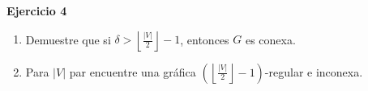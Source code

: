 \textbf{Ejercicio 4}

\begin{enumerate}[label = (\alph*)]
	\item Demuestre que si $\delta > \left\lfloor \frac{|V|}{2}\right\rfloor- 1$,
	      entonces $G$ es conexa.

	\item Para $|V|$ par encuentre una gráfica $\left(\left\lfloor
		      \frac{|V|}{2} \right\rfloor -1\right)$-regular e inconexa.
\end{enumerate}